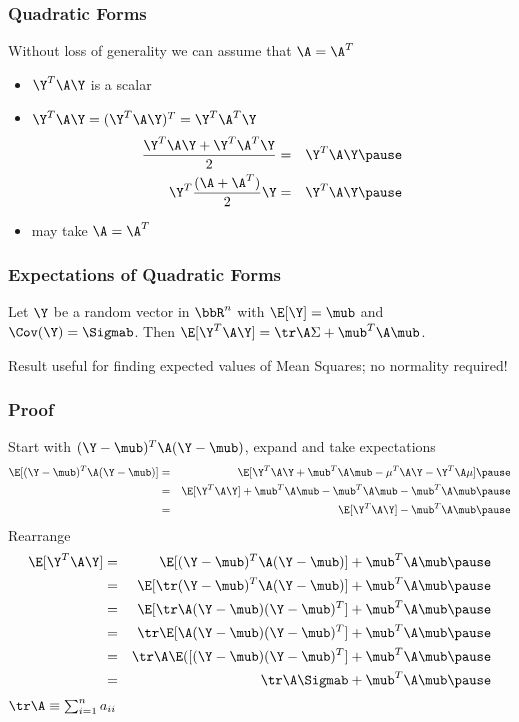 \documentclass[handout]{beamer}
\begin{document}
\begin{frame}
  \frametitle{Quadratic Forms}
  Without loss of generality we can assume that $\A = \A^T$
\pause
  \begin{itemize}
  \item $\Y^T \A \Y$ is a scalar \pause
\item $\Y^T \A \Y  = (\Y ^T\A  \Y)^T = \Y^T \A^T \Y$ \pause
  \begin{eqnarray*}
 \frac{\Y^T \A \Y  + \Y^T \A^T \Y}{2} & = &
\Y^T \A \Y  \pause \\
    \Y^T\frac{(\A + \A^T)}{2}\Y  & = & \Y^T \A \Y \pause
  \end{eqnarray*}
\item may take $\A = \A^T$
  \end{itemize}
\end{frame}
\begin{frame}
  \frametitle{Expectations of Quadratic Forms}
  \begin{theorem}
   Let  $\Y$ be a random vector in $\bbR^n$ with $\E[\Y] = \mub$ and
   $\Cov(\Y) = \Sigmab$.  \pause Then $\E[\Y^T \A \Y] = \tr \A \Sigma + \mub^T
   \A \mub$.
  \end{theorem} \pause
Result useful for finding expected values of Mean Squares; no
normality required!
\end{frame}
\begin{frame}
  \frametitle{Proof}
Start with $(\Y - \mub)^T\A (\Y - \mub)$,  expand and take
expectations \pause
  \begin{eqnarray*}
\E [(\Y - \mub)^T\A (\Y - \mub)] & = & \E[\Y^T\A \Y + \mub^T\A \mub -
    \mu^T\A \Y - \Y^T \A \mu] \pause \\
 & = & \E[\Y^T\A \Y] + \mub^T\A \mub -
\mub^T\A \mub - \mub^T\A \mub \pause \\
 & = & \E[\Y^T\A \Y] - \mub^T\A \mub \pause 
  \end{eqnarray*}
Rearrange \pause
 \begin{eqnarray*}
 \E[\Y^T\A \Y ] & = &  \E[ (\Y - \mub)^T\A (\Y - \mub)] + \mub^T\A
 \mub \pause \\
 & = & \E[ \tr (\Y - \mub)^T\A (\Y - \mub)] + \mub^T\A \mub  \pause\\
 & = & \E[ \tr \A (\Y - \mub) (\Y - \mub)^T] + \mub^T\A
 \mub \pause \\
 & = &\tr  \E[ \A (\Y - \mub) (\Y - \mub)^T] + \mub^T\A \mub \pause \\
 & = &\tr \A \E([ (\Y - \mub) (\Y - \mub)^T] + \mub^T\A \mub \pause \\
 & = &\tr \A \Sigmab + \mub^T\A \mub  \pause
\end{eqnarray*}
\alert<12>{{\small{$\tr \A \equiv \sum_{i=1}^n a_{ii}$}}}
\end{frame}
\end{document}

